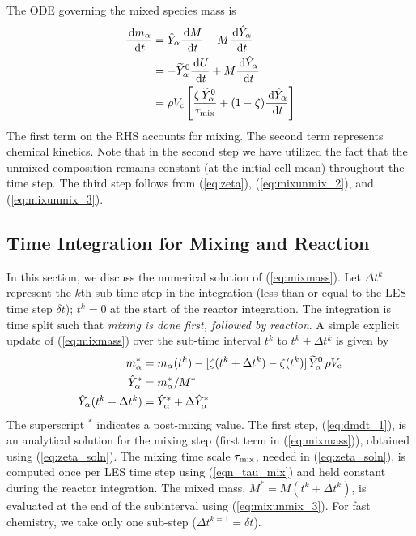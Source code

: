 The ODE governing the mixed species mass is
\begin{align}
\label{eq:mixmass}
\frac{\,\mathrm{d} m_{\alpha}}{\,\mathrm{d} t} &= \hat{Y}_\alpha \frac{\,\mathrm{d} M}{\,\mathrm{d} t} + M \frac{\,\mathrm{d} \hat{Y}_\alpha}{\,\mathrm{d} t} \notag\\
&= - \widetilde{Y}_{\alpha}^0 \frac{\,\mathrm{d} U}{\,\mathrm{d} t} + M \frac{\,\mathrm{d} \hat{Y}_\alpha}{\,\mathrm{d} t} \notag\\
&= \rho V_{\rm c} \left[ \frac{\zeta \, \widetilde{Y}_{\alpha}^0 }{\tau_{\rm mix}} + (1-\zeta) \frac{\,\mathrm{d} \hat{Y}_\alpha}{\,\mathrm{d} t} \right] 
\end{align}
The first term  on the RHS accounts for mixing.  The second term represents chemical kinetics. Note that in the second step we have utilized the fact that the unmixed composition remains constant (at the initial cell mean) throughout the time step. The third step follows from (\ref{eq:zeta}), (\ref{eq:mixunmix_2}), and (\ref{eq:mixunmix_3}).

\subsection{Time Integration for Mixing and Reaction}
\label{sec:reac_time_integration} 

In this section, we discuss the numerical solution of (\ref{eq:mixmass}). Let $\Delta t^k$ represent the $k$th sub-time step in the integration (less than or equal to the LES time step $\delta t$); $t^k=0$ at the start of the reactor integration.  The integration is time split such that \emph{mixing is done first, followed by reaction}. A simple explicit update of (\ref{eq:mixmass}) over the sub-time interval $t^k$ to $t^k + \Delta t^k$ is given by
\begin{align}
\label{eq:dmdt_1} m_\alpha^* &= m_{\alpha}(t^k) - [ \zeta(t^k+\Delta t^k) - \zeta(t^k) ] \, \widetilde{Y}_{\alpha}^0 \, \rho V_{\rm c} \\
\label{eq:ystar}  \hat{Y}_\alpha^* &= m_\alpha^*/M^* \\
\label{eq:dmdt_2} \hat{Y}_\alpha(t^k + \Delta t^k) &= \hat{Y}_\alpha^* + \Delta \hat{Y}_\alpha^* 
\end{align}
The superscript $^*$ indicates a post-mixing value.  The first step, (\ref{eq:dmdt_1}), is an analytical solution for the mixing step (first term in (\ref{eq:mixmass})), obtained using (\ref{eq:zeta_soln}).  The mixing time scale $\tau_{\rm mix}$, needed in (\ref{eq:zeta_soln}), is computed once per LES time step using (\ref{eqn_tau_mix}) and held constant during the reactor integration. The mixed mass, $M^* = M(t^k + \Delta t^k)$, is evaluated at the end of the subinterval using (\ref{eq:mixunmix_3}). For fast chemistry, we take only one sub-step ($\Delta t^{k=1} = \delta t$).

